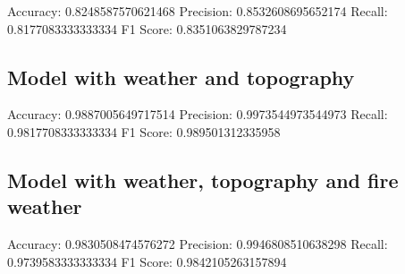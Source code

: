 Accuracy: 0.8248587570621468
Precision: 0.8532608695652174
Recall: 0.8177083333333334
F1 Score: 0.8351063829787234


\subsection{Model with weather and topography}

Accuracy: 0.9887005649717514
Precision: 0.9973544973544973
Recall: 0.9817708333333334
F1 Score: 0.989501312335958

\subsection{Model with weather, topography and fire weather}

Accuracy: 0.9830508474576272
Precision: 0.9946808510638298
Recall: 0.9739583333333334
F1 Score: 0.9842105263157894






